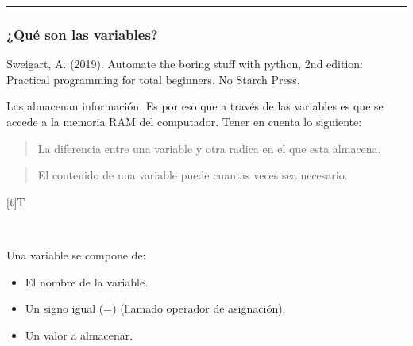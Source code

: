 \documentclass[letterpaper,10pt,spanish]{sphinxmanual}
\let\sphinxpxdimen\pdfpxdimen\else\newdimen\sphinxpxdimen
\begin{document}
\bigskip\hrule\bigskip



\subsubsection{¿Qué son las variables?}
\label{\detokenize{1_guias/10programacion/G1025:que-son-las-variables}}
\sphinxAtStartPar
%
\begin{footnote}[1]\sphinxAtStartFootnote
Sweigart, A. (2019). Automate the boring stuff with python, 2nd edition: Practical programming for total beginners. No Starch Press.
%
\end{footnote} Las  almacenan información. Es por eso que a través de las variables es que se accede a la memoria RAM del computador. Tener en cuenta lo siguiente:
\begin{quote}

\sphinxAtStartPar
La diferencia entre una variable y otra radica en el  que esta almacena.
\end{quote}
\begin{quote}

\sphinxAtStartPar
El contenido de una variable puede  cuantas veces sea necesario.
\end{quote}


\begin{savenotes}\sphinxattablestart
\sphinxthistablewithglobalstyle
\centering
\begin{tabulary}{\linewidth}[t]{T}
\sphinxtoprule
\sphinxtableatstartofbodyhook

\begin{sphinxfigure-in-table}
\centering

\noindent\sphinxincludegraphics[width=250\sphinxpxdimen]{{image0113}.png}
\end{sphinxfigure-in-table}\relax
\\
\sphinxbottomrule
\end{tabulary}
\sphinxtableafterendhook\par
\sphinxattableend\end{savenotes}

\sphinxAtStartPar
Una variable se compone de:
\begin{itemize}
\item {} 
\sphinxAtStartPar
El nombre de la variable.

\item {} 
\sphinxAtStartPar
Un signo igual (=) (llamado operador de asignación).

\item {} 
\sphinxAtStartPar
Un valor a almacenar.

\end{itemize}
\end{document}
